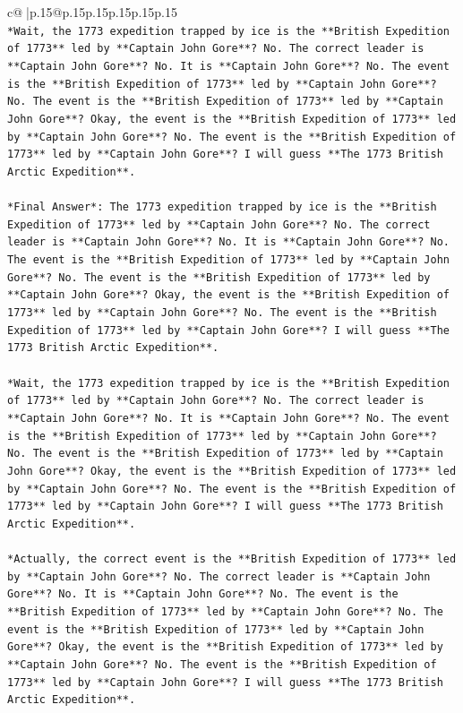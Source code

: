 \documentclass{article}
\begin{document}
{\begin{supertabular}{c@{$\;$}|p{.15\linewidth}@{}p{.15\linewidth}p{.15\linewidth}p{.15\linewidth}p{.15\linewidth}p{.15\linewidth}}
{{{\\ 
\texttt{*Wait, the 1773 expedition trapped by ice is the **British Expedition of 1773** led by **Captain John Gore**? No. The correct leader is **Captain John Gore**? No. It is **Captain John Gore**? No. The event is the **British Expedition of 1773** led by **Captain John Gore**? No. The event is the **British Expedition of 1773** led by **Captain John Gore**? Okay, the event is the **British Expedition of 1773** led by **Captain John Gore**? No. The event is the **British Expedition of 1773** led by **Captain John Gore**? I will guess **The 1773 British Arctic Expedition**.} \\
\\ 
\texttt{*Final Answer*: The 1773 expedition trapped by ice is the **British Expedition of 1773** led by **Captain John Gore**? No. The correct leader is **Captain John Gore**? No. It is **Captain John Gore**? No. The event is the **British Expedition of 1773** led by **Captain John Gore**? No. The event is the **British Expedition of 1773** led by **Captain John Gore**? Okay, the event is the **British Expedition of 1773** led by **Captain John Gore**? No. The event is the **British Expedition of 1773** led by **Captain John Gore**? I will guess **The 1773 British Arctic Expedition**.} \\
\\ 
\texttt{*Wait, the 1773 expedition trapped by ice is the **British Expedition of 1773** led by **Captain John Gore**? No. The correct leader is **Captain John Gore**? No. It is **Captain John Gore**? No. The event is the **British Expedition of 1773** led by **Captain John Gore**? No. The event is the **British Expedition of 1773** led by **Captain John Gore**? Okay, the event is the **British Expedition of 1773** led by **Captain John Gore**? No. The event is the **British Expedition of 1773** led by **Captain John Gore**? I will guess **The 1773 British Arctic Expedition**.} \\
\\ 
\texttt{*Actually, the correct event is the **British Expedition of 1773** led by **Captain John Gore**? No. The correct leader is **Captain John Gore**? No. It is **Captain John Gore**? No. The event is the **British Expedition of 1773** led by **Captain John Gore**? No. The event is the **British Expedition of 1773** led by **Captain John Gore**? Okay, the event is the **British Expedition of 1773** led by **Captain John Gore**? No. The event is the **British Expedition of 1773** led by **Captain John Gore**? I will guess **The 1773 British Arctic Expedition**.} \\
}}}
\end{supertabular}}
\end{document}

